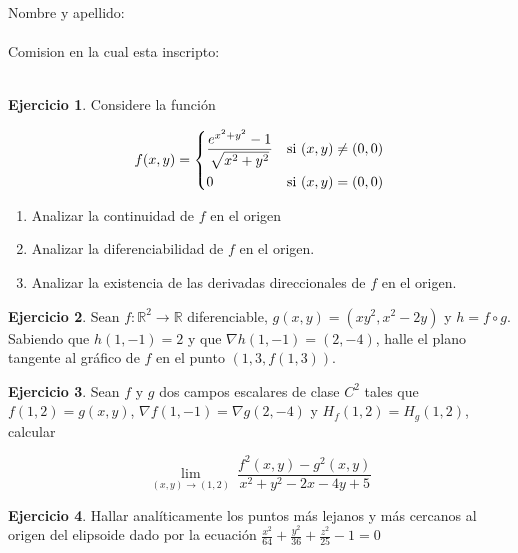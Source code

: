 \documentclass[10pt, a4paper]{report}
\renewcommand{\Re}{\mathbb {R}}
\theoremstyle{definition} %
\newtheorem{question}{Ejercicio}
\begin{document}
Nombre y apellido: \\
\\
Comision en la cual esta inscripto:
\\
\\
\begin{question}
    Considere la función
    
     \[
        f(x,y) =
        \begin{dcases}
            \frac{e^{x^{2}+y^{2}}-1}{\sqrt{x^{2}+y^{2}}} & \textnormal{si}\ (x,y) \neq (0,0) \\
            0                         & \textnormal{si}\ (x,y) = (0,0)
        \end{dcases}
    \]

    \begin{enumerate}
        \item Analizar la continuidad de $f$ en el origen
        \item Analizar la diferenciabilidad de $f$ en el origen.
        \item Analizar la existencia de las derivadas direccionales de $f$ en el origen.\\
    \end{enumerate}
\end{question}

\begin{question}
    Sean $f:\Re^{2}\to\Re$ diferenciable, $g(x,y)=(xy^2,x^2-2y)$ y $h=f\circ g$. Sabiendo que $h(1,-1) = 2$ y que $\nabla h(1,-1)=(2,-4)$, halle el plano tangente al gráfico de $f$ en el punto $(1,3,f(1,3))$.
\end{question}
\begin{question}
    Sean $f$ y $g$ dos campos escalares de clase $C^2$ tales que $f(1,2)=g(x,y)$, $\nabla f(1,-1)=\nabla g(2,-4)$ y $H_f(1,2)=H_g(1,2)$, calcular 
    
\[
        \lim_{(x,y)\to(1,2)} \
        \frac{f^2(x,y)-g^2(x,y)}{x^2+y^2-2x-4y+5}
    \]
\end{question}
\begin{question}
    Hallar analíticamente los puntos más lejanos y más cercanos al origen del elipsoide dado por la ecuación {\large$\frac{x^2}{64}+\frac{y^2}{36}+\frac{z^2}{25}-1=0$}
\end{question}
\newpage
\end{document}
